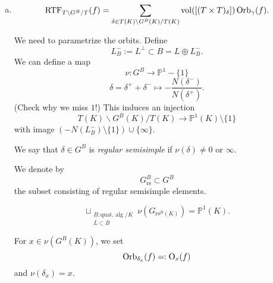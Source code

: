 \documentclass[reqno]{amsart} 
\numberwithin{theorem}{section}
\numberwithin{equation}{section}
\numberwithin{exercise}{section}
\begin{document}
\begin{enumerate}[(a)]
\item
  \begin{equation*}
    \mathrm{RTF}_{T \backslash G^B / T}(f) = \sum_{\delta \in T(K) \backslash G^B(K) / T(K)}
    \operatorname{vol}([(T \times T)_\delta]) \operatorname{Orb}_\gamma(f).
  \end{equation*}
  \begin{exercise}\label{exercise:cq6tyalwr3}
    We need to parametrize the orbits.  Define
    \begin{equation*}
      L_B^- := L^\perp \subset B = L \oplus L_B^-.
    \end{equation*}
    We can define a map
    \begin{equation*}
      \nu : G^B \rightarrow \mathbb{P}^1 - \{1\}
    \end{equation*}
    \begin{equation*}
      \delta = \delta^+ + \delta^- \mapsto - \frac{N(\delta^-)}{N(\delta^+)}.
    \end{equation*}
    (Check why we miss $1$!)  This induces an injection
    \begin{equation*}
      T(K) \backslash G^B(K) / T(K) \rightarrow \mathbb{P}^1(K) \setminus \{1\}
    \end{equation*}
    with image $(- N(L_B^-) \setminus \{1\}) \cup \{\infty\}$.
  \end{exercise}
  \begin{definition}\label{definition:cq6tyalx5j}
    We say that  $\delta \in G^B$ is \emph{regular semisimple} if $\nu(\delta) \neq 0$ or $\infty$.
  \end{definition}
  We denote by
  \begin{equation*}
    G_{\mathrm{rs}}^B \subset G^B
  \end{equation*}
  the subset consisting of regular semisimple elements.

  \begin{exercise}\label{exercise:cq6tyaqy0z}
    \begin{equation*}
      \sqcup_{
        \substack{
          B: \text{quat.\ alg }/ K  \\
          L \subset B          
        }
      }
      \nu(G_{\mathrm{rs}^B(K)})
      = \mathbb{P}^1(K).
    \end{equation*}
  \end{exercise}
  \begin{notation}\label{notation:1}
    For $x \in \nu(G^B(K))$, we set
    \begin{equation}\label{eq:cq6tyc779o}
      \operatorname{Orb}_{\delta_x}(f) =: \operatorname{O}_x(f)
    \end{equation}
    and $\nu(\delta_x) = x$.


\end{notation}
\end{enumerate}
\end{document}
